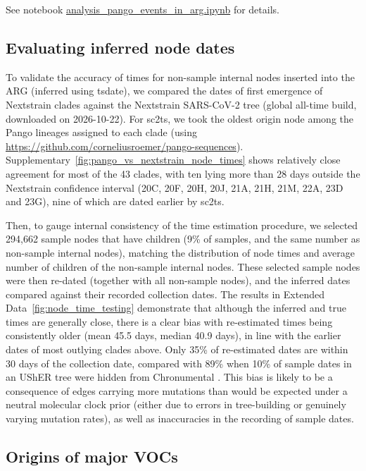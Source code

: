 \documentclass[12pt]{article}
\newcommand{\edref}[1]{Extended Data~\ref{#1}}
\newcommand{\siref}[1]{Supplementary~\ref{#1}}
\begin{document}
See notebook
\href{https://github.com/jeromekelleher/sc2ts-paper/blob/main/notebooks/analysis\_pango\_events\_in\_arg.ipynb}
{analysis\_pango\_events\_in\_arg.ipynb}
for details.


\subsection{Evaluating inferred node dates}
\label{sec:evaluating_node_dates}

To validate the accuracy of times for non-sample internal nodes
inserted into the ARG (inferred using tsdate),
we compared the dates of first emergence of
Nextstrain clades against the Nextstrain SARS-CoV-2 tree
(global all-time build, downloaded on 2026-10-22).
For sc2ts, we took the oldest origin node among the Pango lineages
assigned to each clade
(using \url{https://github.com/corneliusroemer/pango-sequences}).
\siref{fig:pango_vs_nextstrain_node_times} shows
relatively close agreement for most of the 43 clades,
with ten lying more than 28 days outside the Nextstrain confidence interval
(20C, 20F, 20H, 20J, 21A, 21H, 21M, 22A, 23D and 23G),
nine of which are dated earlier by sc2ts.

Then, to gauge internal consistency of the time estimation procedure,
we selected 294,662 sample nodes that have children
(9\% of samples, and the same number as non-sample internal nodes),
matching the distribution of node times  and
average number of children of the non-sample internal nodes.
These selected sample nodes were then re-dated (together with all non-sample nodes), and
the inferred dates compared against their recorded collection dates.
The results in \edref{fig:node_time_testing} demonstrate that
although the inferred and true times are generally close,
there is a clear bias with re-estimated times
being consistently older (mean 45.5 days, median 40.9 days),
in line with the earlier dates of most outlying clades above.
Only 35\% of re-estimated dates are within 30 days of the collection date,
compared with 89\% when 10\% of sample dates in an UShER tree
were hidden from Chronumental \cite{sanderson2021chronumental}.
This bias is likely to be a consequence of edges
carrying more mutations than would be expected
under a neutral molecular clock prior
(either due to errors in tree-building or genuinely varying mutation rates),
as well as inaccuracies in the recording of sample dates.

\subsection{Origins of major VOCs}
\end{document}
